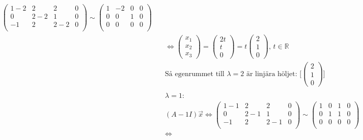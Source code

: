 \begin{align*}
  \left(\begin{array}{ccc|c}
    1-2 & 2   & 2   & 0 \\
    0   & 2-2 & 1   & 0 \\
   -1   & 2   & 2-2 & 0 \\
  \end{array}\right) \sim{}
  \left(\begin{array}{ccc|c}
    1 & -2 & 0 & 0 \\
    0 &  0 & 1 & 0 \\
    0 &  0 & 0 & 0 \\
  \end{array}\right) \\
  &\quad \Leftrightarrow{}
  \begin{pmatrix} x_1 \\ x_2 \\ x_3 \end{pmatrix} =
  \begin{pmatrix} 2t \\ t \\ 0 \end{pmatrix} =
  t\begin{pmatrix} 2 \\ 1 \\ 0 \end{pmatrix}, \, t\in\mathbb{R} \\
  &\quad \text{Så egenrummet till $\lambda=2$ är linjära höljet: }
  \Big[ \begin{pmatrix} 2 \\ 1 \\ 0 \end{pmatrix} \Big]  \\
  &\quad  \\
  &\quad  \lambda=1: \\
  &\quad  (A-1I)\vec{x} \Leftrightarrow{}
  \left(\begin{array}{ccc|c}
    1-1 & 2   & 2   & 0 \\
    0   & 2-1 & 1   & 0 \\
   -1   & 2   & 2-1 & 0 \\
  \end{array}\right) \sim{}
  \left(\begin{array}{ccc|c}
    1 &  0 & 1 & 0 \\
    0 &  1 & 1 & 0 \\
    0 &  0 & 0 & 0 \\
  \end{array}\right) \\
  &\quad \Leftrightarrow{}

\end{align*}
